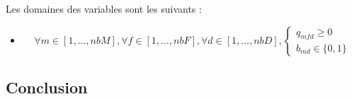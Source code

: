 Les domaines des variables sont les suivants :

\begin{itemize}

\item
\[\forall m \in [1, \ldots, nbM], \forall f \in [1, \ldots, nbF], \forall d \in [1, \ldots, nbD] ,
\begin{cases}
q_{mfd} \geq 0 \\
 b_{md} \in \{0, 1\}
 \end{cases}
\]

\end{itemize}

\subsection{Conclusion}

